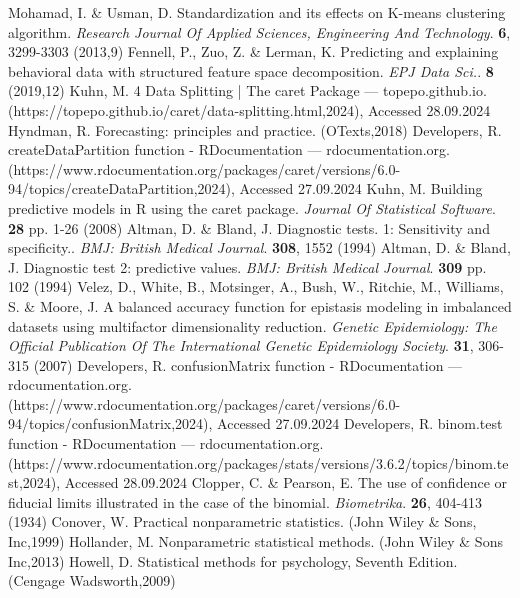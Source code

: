 \documentclass[sn-mathphys-num]{sn-jnl}%
\begin{document}
\begin{thebibliography}{000}
Mohamad, I. \& Usman, D. Standardization and its effects on K-means clustering algorithm. {\em Research Journal Of Applied Sciences, Engineering And Technology}. \textbf{6}, 3299-3303 (2013,9)
Fennell, P., Zuo, Z. \& Lerman, K. Predicting and explaining behavioral data with structured feature space decomposition. {\em EPJ Data Sci.}. \textbf{8} (2019,12)
Kuhn, M. 4 Data Splitting | The caret Package — topepo.github.io. (https://topepo.github.io/caret/data-splitting.html,2024), Accessed 28.09.2024
Hyndman, R. Forecasting: principles and practice. (OTexts,2018)
Developers, R. createDataPartition function - RDocumentation — rdocumentation.org. (https://www.rdocumentation.org/packages/caret/versions/6.0-94/topics/createDataPartition,2024), Accessed 27.09.2024
Kuhn, M. Building predictive models in R using the caret package. {\em Journal Of Statistical Software}. \textbf{28} pp. 1-26 (2008)
Altman, D. \& Bland, J. Diagnostic tests. 1: Sensitivity and specificity.. {\em BMJ: British Medical Journal}. \textbf{308}, 1552 (1994)
Altman, D. \& Bland, J. Diagnostic test 2: predictive values. {\em BMJ: British Medical Journal}. \textbf{309} pp. 102 (1994)
Velez, D., White, B., Motsinger, A., Bush, W., Ritchie, M., Williams, S. \& Moore, J. A balanced accuracy function for epistasis modeling in imbalanced datasets using multifactor dimensionality reduction. {\em Genetic Epidemiology: The Official Publication Of The International Genetic Epidemiology Society}. \textbf{31}, 306-315 (2007)
Developers, R. confusionMatrix function - RDocumentation — rdocumentation.org. (https://www.rdocumentation.org/packages/caret/versions/6.0-94/topics/confusionMatrix,2024), Accessed 27.09.2024
Developers, R. binom.test function - RDocumentation — rdocumentation.org. (https://www.rdocumentation.org/packages/stats/versions/3.6.2/topics/binom.test,2024), Accessed 28.09.2024
Clopper, C. \& Pearson, E. The use of confidence or fiducial limits illustrated in the case of the binomial. {\em Biometrika}. \textbf{26}, 404-413 (1934)
Conover, W. Practical nonparametric statistics. (John Wiley & Sons, Inc,1999)
Hollander, M. Nonparametric statistical methods. (John Wiley & Sons Inc,2013)
Howell, D. Statistical methods for psychology, Seventh Edition. (Cengage Wadsworth,2009)

\end{thebibliography}
\end{document}
